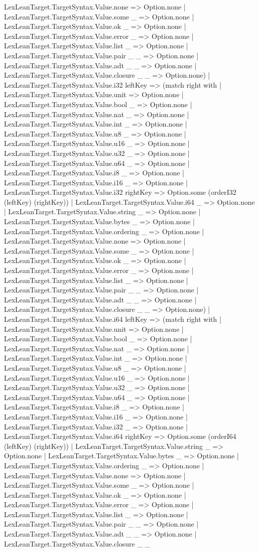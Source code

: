 \documentclass[11pt]{article}
\begin{document}
LexLeanTarget.TargetSyntax.Value.none => Option.none | LexLeanTarget.TargetSyntax.Value.some \_ => Option.none | LexLeanTarget.TargetSyntax.Value.ok \_ => Option.none | LexLeanTarget.TargetSyntax.Value.error \_ => Option.none | LexLeanTarget.TargetSyntax.Value.list \_ => Option.none | LexLeanTarget.TargetSyntax.Value.pair \_ \_ => Option.none | LexLeanTarget.TargetSyntax.Value.adt \_ \_ => Option.none | LexLeanTarget.TargetSyntax.Value.closure \_ \_ => Option.none) | LexLeanTarget.TargetSyntax.Value.i32 leftKey => (match right with | LexLeanTarget.TargetSyntax.Value.unit => Option.none | LexLeanTarget.TargetSyntax.Value.bool \_ => Option.none | LexLeanTarget.TargetSyntax.Value.nat \_ => Option.none | LexLeanTarget.TargetSyntax.Value.int \_ => Option.none | LexLeanTarget.TargetSyntax.Value.u8 \_ => Option.none | LexLeanTarget.TargetSyntax.Value.u16 \_ => Option.none | LexLeanTarget.TargetSyntax.Value.u32 \_ => Option.none | LexLeanTarget.TargetSyntax.Value.u64 \_ => Option.none | LexLeanTarget.TargetSyntax.Value.i8 \_ => Option.none | LexLeanTarget.TargetSyntax.Value.i16 \_ => Option.none | LexLeanTarget.TargetSyntax.Value.i32 rightKey => Option.some (orderI32 (leftKey) (rightKey)) | LexLeanTarget.TargetSyntax.Value.i64 \_ => Option.none | LexLeanTarget.TargetSyntax.Value.string \_ => Option.none | LexLeanTarget.TargetSyntax.Value.bytes \_ => Option.none | LexLeanTarget.TargetSyntax.Value.ordering \_ => Option.none | LexLeanTarget.TargetSyntax.Value.none => Option.none | LexLeanTarget.TargetSyntax.Value.some \_ => Option.none | LexLeanTarget.TargetSyntax.Value.ok \_ => Option.none | LexLeanTarget.TargetSyntax.Value.error \_ => Option.none | LexLeanTarget.TargetSyntax.Value.list \_ => Option.none | LexLeanTarget.TargetSyntax.Value.pair \_ \_ => Option.none | LexLeanTarget.TargetSyntax.Value.adt \_ \_ => Option.none | LexLeanTarget.TargetSyntax.Value.closure \_ \_ => Option.none) | LexLeanTarget.TargetSyntax.Value.i64 leftKey => (match right with | LexLeanTarget.TargetSyntax.Value.unit => Option.none | LexLeanTarget.TargetSyntax.Value.bool \_ => Option.none | LexLeanTarget.TargetSyntax.Value.nat \_ => Option.none | LexLeanTarget.TargetSyntax.Value.int \_ => Option.none | LexLeanTarget.TargetSyntax.Value.u8 \_ => Option.none | LexLeanTarget.TargetSyntax.Value.u16 \_ => Option.none | LexLeanTarget.TargetSyntax.Value.u32 \_ => Option.none | LexLeanTarget.TargetSyntax.Value.u64 \_ => Option.none | LexLeanTarget.TargetSyntax.Value.i8 \_ => Option.none | LexLeanTarget.TargetSyntax.Value.i16 \_ => Option.none | LexLeanTarget.TargetSyntax.Value.i32 \_ => Option.none | LexLeanTarget.TargetSyntax.Value.i64 rightKey => Option.some (orderI64 (leftKey) (rightKey)) | LexLeanTarget.TargetSyntax.Value.string \_ => Option.none | LexLeanTarget.TargetSyntax.Value.bytes \_ => Option.none | LexLeanTarget.TargetSyntax.Value.ordering \_ => Option.none | LexLeanTarget.TargetSyntax.Value.none => Option.none | LexLeanTarget.TargetSyntax.Value.some \_ => Option.none | LexLeanTarget.TargetSyntax.Value.ok \_ => Option.none | LexLeanTarget.TargetSyntax.Value.error \_ => Option.none | LexLeanTarget.TargetSyntax.Value.list \_ => Option.none | LexLeanTarget.TargetSyntax.Value.pair \_ \_ => Option.none | LexLeanTarget.TargetSyntax.Value.adt \_ \_ => Option.none | LexLeanTarget.TargetSyntax.Value.closure \_ \_ 
\end{document}
